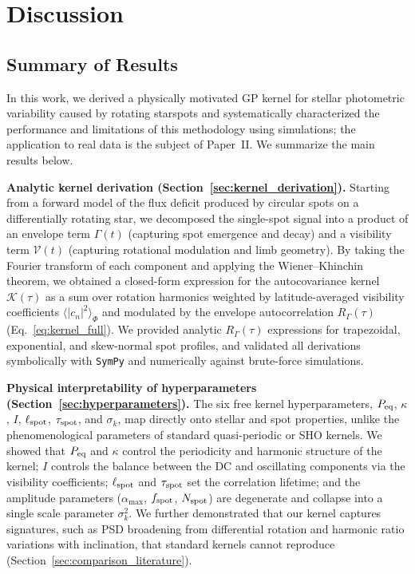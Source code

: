 \documentclass[preprint]{aastex702}
\newcommand{\code}[1]{{\texttt{#1}}}
\begin{document}
\clearpage
\section{Discussion} \label{sec:discussion}

\subsection{Summary of Results} \label{sec:summary_results}

In this work, we derived a physically motivated GP kernel for stellar photometric variability caused by rotating starspots and systematically characterized the performance and limitations of this methodology using simulations; the application to real data is the subject of Paper~II. We summarize the main results below.

\textbf{Analytic kernel derivation (Section~\ref{sec:kernel_derivation}).}
Starting from a forward model of the flux deficit produced by circular spots on a differentially rotating star, we decomposed the single-spot signal into a product of an envelope term $\Gamma(t)$ (capturing spot emergence and decay) and a visibility term $\mathcal{V}(t)$ (capturing rotational modulation and limb geometry). By taking the Fourier transform of each component and applying the Wiener--Khinchin theorem, we obtained a closed-form expression for the autocovariance kernel $\mathcal{K}(\tau)$ as a sum over rotation harmonics weighted by latitude-averaged visibility coefficients $\langle |c_n|^2 \rangle_\Phi$ and modulated by the envelope autocorrelation $R_\Gamma(\tau)$ (Eq.~\ref{eq:kernel_full}). We provided analytic $R_\Gamma(\tau)$ expressions for trapezoidal, exponential, and skew-normal spot profiles, and validated all derivations symbolically with \code{SymPy} and numerically against brute-force simulations.

\textbf{Physical interpretability of hyperparameters (Section~\ref{sec:hyperparameters}).}
The six free kernel hyperparameters, $P_{\rm eq}$, $\kappa$, $I$, $\ell_{\rm spot}$, $\tau_{\rm spot}$, and $\sigma_k$, map directly onto stellar and spot properties, unlike the phenomenological parameters of standard quasi-periodic or SHO kernels. We showed that $P_{\rm eq}$ and $\kappa$ control the periodicity and harmonic structure of the kernel; $I$ controls the balance between the DC and oscillating components via the visibility coefficients; $\ell_{\rm spot}$ and $\tau_{\rm spot}$ set the correlation lifetime; and the amplitude parameters ($\alpha_{\max}$, $f_{\rm spot}$, $N_{\rm spot}$) are degenerate and collapse into a single scale parameter $\sigma_k^2$. We further demonstrated that our kernel captures signatures, such as PSD broadening from differential rotation and harmonic ratio variations with inclination, that standard kernels cannot reproduce (Section~\ref{sec:comparison_literature}).
\end{document}
